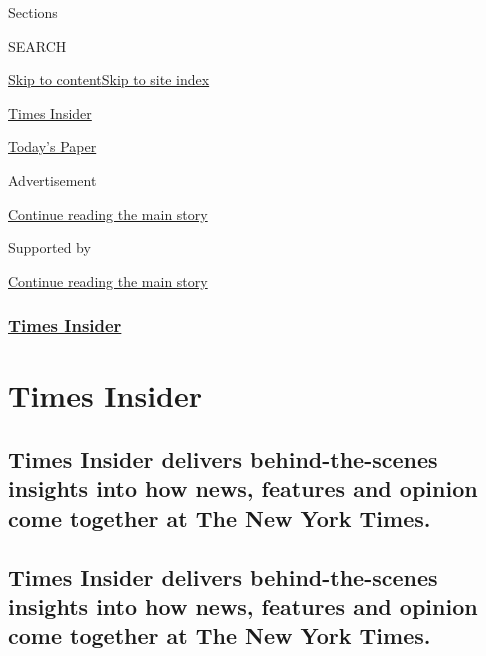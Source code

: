 Sections

SEARCH

\protect\hyperlink{site-content}{Skip to
content}\protect\hyperlink{site-index}{Skip to site index}

\href{https://www.nytimes3xbfgragh.onion/series/times-insider}{Times
Insider}

\href{https://myaccount.nytimes3xbfgragh.onion/auth/login?response_type=cookie\&client_id=vi}{}

\href{https://www.nytimes3xbfgragh.onion/section/todayspaper}{Today's
Paper}

Advertisement

\protect\hyperlink{after-top}{Continue reading the main story}

Supported by

\protect\hyperlink{after-sponsor}{Continue reading the main story}

\hypertarget{times-insider}{%
\subsubsection{\texorpdfstring{\href{/section/insider}{Times
Insider}}{Times Insider}}\label{times-insider}}

\hypertarget{times-insider-1}{%
\section{Times Insider}\label{times-insider-1}}

\hypertarget{times-insider-delivers-behind-the-scenes-insights-into-how-news-features-and-opinion-come-together-at-the-new-york-times}{%
\subsection{Times Insider delivers behind-the-scenes insights into how
news, features and opinion come together at The New York
Times.}\label{times-insider-delivers-behind-the-scenes-insights-into-how-news-features-and-opinion-come-together-at-the-new-york-times}}

\hypertarget{times-insider-delivers-behind-the-scenes-insights-into-how-news-features-and-opinion-come-together-at-the-new-york-times-1}{%
\subsection{Times Insider delivers behind-the-scenes insights into how
news, features and opinion come together at The New York
Times.}\label{times-insider-delivers-behind-the-scenes-insights-into-how-news-features-and-opinion-come-together-at-the-new-york-times-1}}

